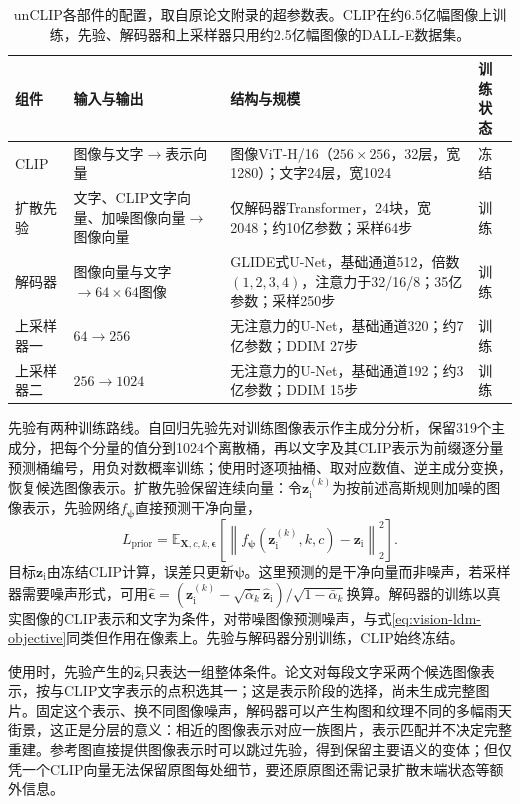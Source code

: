 \begin{table}[htbp]
  \centering
  \small
  \begin{tabularx}{\linewidth}{@{}p{16mm}XXp{12mm}@{}}
    \toprule
    组件 & 输入与输出 & 结构与规模 & 训练状态\\
    \midrule
    CLIP & 图像与文字$\to$表示向量 & 图像ViT-H/16（$256\times256$，32层，宽1280）；文字24层，宽1024 & 冻结\\
    扩散先验 & 文字、CLIP文字向量、加噪图像向量$\to$图像向量 & 仅解码器Transformer，24块，宽2048；约10亿参数；采样64步 & 训练\\
    解码器 & 图像向量与文字$\to64\times64$图像 & GLIDE式U-Net，基础通道512，倍数$(1,2,3,4)$，注意力于32/16/8；35亿参数；采样250步 & 训练\\
    上采样器一 & $64\to256$ & 无注意力的U-Net，基础通道320；约7亿参数；DDIM 27步 & 训练\\
    上采样器二 & $256\to1024$ & 无注意力的U-Net，基础通道192；约3亿参数；DDIM 15步 & 训练\\
    \bottomrule
  \end{tabularx}
  \caption{unCLIP各部件的配置，取自原论文附录的超参数表。CLIP在约6.5亿幅图像上训练，先验、解码器和上采样器只用约2.5亿幅图像的DALL-E数据集。}
  \label{tab:vision-models-unclip-config}
\end{table}

先验有两种训练路线。自回归先验先对训练图像表示作主成分分析，保留319个主成分，把每个分量的值分到1024个离散桶，再以文字及其CLIP表示为前缀逐分量预测桶编号，用负对数概率训练；使用时逐项抽桶、取对应数值、逆主成分变换，恢复候选图像表示。扩散先验保留连续向量：令$\bm z_{\mathrm i}^{(k)}$为按前述高斯规则加噪的图像表示，先验网络$f_{\bm\psi}$直接预测干净向量，
\begin{equation}
  L_{\mathrm{prior}}
   =\mathbb E_{\bm X,c,k,\bm\epsilon}
      \left[\left\lVert
         f_{\bm\psi}(\bm z_{\mathrm i}^{(k)},k,c)
           -\bm z_{\mathrm i}\right\rVert_2^2\right].
  \label{eq:vision-unclip-prior-objective}
\end{equation}
目标$\bm z_{\mathrm i}$由冻结CLIP计算，误差只更新$\bm\psi$。这里预测的是干净向量而非噪声，若采样器需要噪声形式，可用$\widehat{\bm\epsilon}=(\bm z_{\mathrm i}^{(k)}-\sqrt{\bar\alpha_k}\widehat{\bm z}_{\mathrm i})/\sqrt{1-\bar\alpha_k}$换算。解码器的训练以真实图像的CLIP表示和文字为条件，对带噪图像预测噪声，与式\eqref{eq:vision-ldm-objective}同类但作用在像素上。先验与解码器分别训练，CLIP始终冻结。

使用时，先验产生的$\widehat{\bm z}_{\mathrm i}$只表达一组整体条件。论文对每段文字采两个候选图像表示，按与CLIP文字表示的点积选其一；这是表示阶段的选择，尚未生成完整图片。固定这个表示、换不同图像噪声，解码器可以产生构图和纹理不同的多幅雨天街景，这正是分层的意义：相近的图像表示对应一族图片，表示匹配并不决定完整重建。参考图直接提供图像表示时可以跳过先验，得到保留主要语义的变体；但仅凭一个CLIP向量无法保留原图每处细节，要还原原图还需记录扩散末端状态等额外信息。

